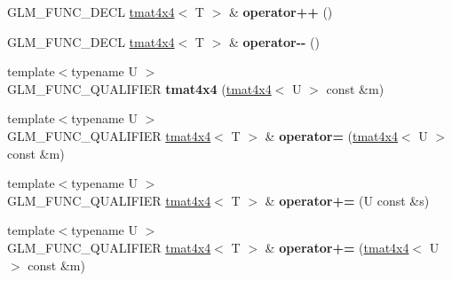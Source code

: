 \begin{DoxyCompactItemize}
\item 
\hypertarget{structglm_1_1detail_1_1tmat4x4_aefaf1ee62f13e648094f42e1611fca9b}{G\-L\-M\-\_\-\-F\-U\-N\-C\-\_\-\-D\-E\-C\-L \hyperlink{structglm_1_1detail_1_1tmat4x4}{tmat4x4}$<$ T $>$ \& {\bfseries operator++} ()}\label{structglm_1_1detail_1_1tmat4x4_aefaf1ee62f13e648094f42e1611fca9b}

\item 
\hypertarget{structglm_1_1detail_1_1tmat4x4_a1066ea037bd5c24e8c6fdf194a76e463}{G\-L\-M\-\_\-\-F\-U\-N\-C\-\_\-\-D\-E\-C\-L \hyperlink{structglm_1_1detail_1_1tmat4x4}{tmat4x4}$<$ T $>$ \& {\bfseries operator-\/-\/} ()}\label{structglm_1_1detail_1_1tmat4x4_a1066ea037bd5c24e8c6fdf194a76e463}

\item 
\hypertarget{structglm_1_1detail_1_1tmat4x4_a2ddeeee14f3dd1e5c521512dc8051e3f}{{\footnotesize template$<$typename U $>$ }\\G\-L\-M\-\_\-\-F\-U\-N\-C\-\_\-\-Q\-U\-A\-L\-I\-F\-I\-E\-R {\bfseries tmat4x4} (\hyperlink{structglm_1_1detail_1_1tmat4x4}{tmat4x4}$<$ U $>$ const \&m)}\label{structglm_1_1detail_1_1tmat4x4_a2ddeeee14f3dd1e5c521512dc8051e3f}

\item 
\hypertarget{structglm_1_1detail_1_1tmat4x4_ab97d240d34aa87e20893cc5ddf07c26f}{{\footnotesize template$<$typename U $>$ }\\G\-L\-M\-\_\-\-F\-U\-N\-C\-\_\-\-Q\-U\-A\-L\-I\-F\-I\-E\-R \hyperlink{structglm_1_1detail_1_1tmat4x4}{tmat4x4}$<$ T $>$ \& {\bfseries operator=} (\hyperlink{structglm_1_1detail_1_1tmat4x4}{tmat4x4}$<$ U $>$ const \&m)}\label{structglm_1_1detail_1_1tmat4x4_ab97d240d34aa87e20893cc5ddf07c26f}

\item 
\hypertarget{structglm_1_1detail_1_1tmat4x4_a96cccd5229d378631d6d476763d94611}{{\footnotesize template$<$typename U $>$ }\\G\-L\-M\-\_\-\-F\-U\-N\-C\-\_\-\-Q\-U\-A\-L\-I\-F\-I\-E\-R \hyperlink{structglm_1_1detail_1_1tmat4x4}{tmat4x4}$<$ T $>$ \& {\bfseries operator+=} (U const \&s)}\label{structglm_1_1detail_1_1tmat4x4_a96cccd5229d378631d6d476763d94611}

\item 
\hypertarget{structglm_1_1detail_1_1tmat4x4_a4aec7f20e371dc5b2b606a51d95ce09d}{{\footnotesize template$<$typename U $>$ }\\G\-L\-M\-\_\-\-F\-U\-N\-C\-\_\-\-Q\-U\-A\-L\-I\-F\-I\-E\-R \hyperlink{structglm_1_1detail_1_1tmat4x4}{tmat4x4}$<$ T $>$ \& {\bfseries operator+=} (\hyperlink{structglm_1_1detail_1_1tmat4x4}{tmat4x4}$<$ U $>$ const \&m)}\label{structglm_1_1detail_1_1tmat4x4_a4aec7f20e371dc5b2b606a51d95ce09d}


\end{DoxyCompactItemize}
